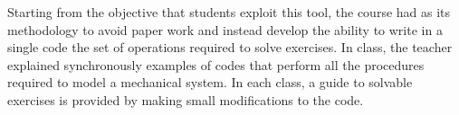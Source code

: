 Starting from the objective that students exploit this tool, the course had as its methodology to avoid paper work and instead develop the ability to write in a single code the set of operations required to solve exercises. In class, the teacher explained synchronously examples of codes that perform all the procedures required to model a mechanical system. In each class, a guide to solvable exercises is provided by making small modifications to the code.


















